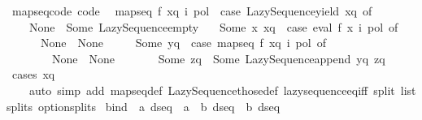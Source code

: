 \begin{isabellebody}
\isanewline
{}\isamarkupfalse%
\ map{\isacharunderscore}{\kern0pt}seq{\isacharunderscore}{\kern0pt}code\ {\isacharbrackleft}{\kern0pt}code{\isacharbrackright}{\kern0pt}{\isacharcolon}{\kern0pt}\isanewline
\ \ {\isachardoublequoteopen}map{\isacharunderscore}{\kern0pt}seq\ f\ xq\ i\ pol\ {\isacharequal}{\kern0pt}\ {\isacharparenleft}{\kern0pt}case\ Lazy{\isacharunderscore}{\kern0pt}Sequence{\isachardot}{\kern0pt}yield\ xq\ of\isanewline
\ \ \ \ None\ {\isasymRightarrow}\ Some\ Lazy{\isacharunderscore}{\kern0pt}Sequence{\isachardot}{\kern0pt}empty\isanewline
\ \ {\isacharbar}{\kern0pt}\ Some\ {\isacharparenleft}{\kern0pt}x{\isacharcomma}{\kern0pt}\ xq{\isacharprime}{\kern0pt}{\isacharparenright}{\kern0pt}\ {\isasymRightarrow}\ {\isacharparenleft}{\kern0pt}case\ eval\ {\isacharparenleft}{\kern0pt}f\ x{\isacharparenright}{\kern0pt}\ i\ pol\ of\isanewline
\ \ \ \ \ \ None\ {\isasymRightarrow}\ None\isanewline
\ \ \ \ {\isacharbar}{\kern0pt}\ Some\ yq\ {\isasymRightarrow}\ {\isacharparenleft}{\kern0pt}case\ map{\isacharunderscore}{\kern0pt}seq\ f\ xq{\isacharprime}{\kern0pt}\ i\ pol\ of\isanewline
\ \ \ \ \ \ \ \ None\ {\isasymRightarrow}\ None\isanewline
\ \ \ \ \ \ {\isacharbar}{\kern0pt}\ Some\ zq\ {\isasymRightarrow}\ Some\ {\isacharparenleft}{\kern0pt}Lazy{\isacharunderscore}{\kern0pt}Sequence{\isachardot}{\kern0pt}append\ yq\ zq{\isacharparenright}{\kern0pt}{\isacharparenright}{\kern0pt}{\isacharparenright}{\kern0pt}{\isacharparenright}{\kern0pt}{\isachardoublequoteclose}\isanewline
%
\isadelimproof
\ \ %
\endisadelimproof
%
\isatagproof
{}\isamarkupfalse%
\ {\isacharparenleft}{\kern0pt}cases\ xq{\isacharparenright}{\kern0pt}\isanewline
\ \ \ \ {\isacharparenleft}{\kern0pt}auto\ simp\ add{\isacharcolon}{\kern0pt}\ map{\isacharunderscore}{\kern0pt}seq{\isacharunderscore}{\kern0pt}def\ Lazy{\isacharunderscore}{\kern0pt}Sequence{\isachardot}{\kern0pt}those{\isacharunderscore}{\kern0pt}def\ lazy{\isacharunderscore}{\kern0pt}sequence{\isacharunderscore}{\kern0pt}eq{\isacharunderscore}{\kern0pt}iff\ split{\isacharcolon}{\kern0pt}\ list{\isachardot}{\kern0pt}splits\ option{\isachardot}{\kern0pt}splits{\isacharparenright}{\kern0pt}%
\endisatagproof
{\isafoldproof}%
%
\isadelimproof
\isanewline
%
\endisadelimproof
\isanewline
{}\isamarkupfalse%
\ bind\ {\isacharcolon}{\kern0pt}{\isacharcolon}{\kern0pt}\ {\isachardoublequoteopen}{\isacharprime}{\kern0pt}a\ dseq\ {\isasymRightarrow}\ {\isacharparenleft}{\kern0pt}{\isacharprime}{\kern0pt}a\ {\isasymRightarrow}\ {\isacharprime}{\kern0pt}b\ dseq{\isacharparenright}{\kern0pt}\ {\isasymRightarrow}\ {\isacharprime}{\kern0pt}b\ dseq{\isachardoublequoteclose}\isanewline

\end{isabellebody}
